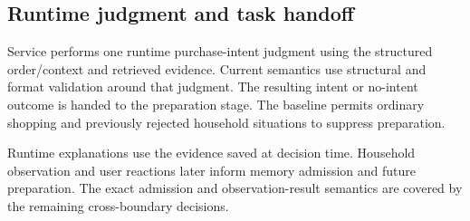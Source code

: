 \subsection{Runtime judgment and task handoff}

Service performs one runtime purchase-intent judgment using the structured
order/context and retrieved evidence. Current semantics use structural and
format validation around that judgment. The resulting intent or no-intent
outcome is handed to the preparation stage. The baseline permits ordinary
shopping and previously rejected household situations to suppress preparation.


Runtime explanations use the evidence saved at decision time. Household
observation and user reactions later inform memory admission and future
preparation. The exact admission and observation-result semantics are covered
by the remaining cross-boundary decisions. 
